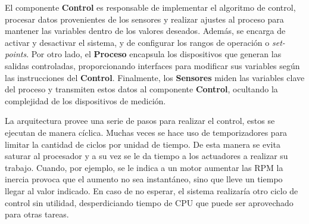 \begin{figure}[h!]
\end{figure}

El componente \textbf{Control} es responsable de implementar el algoritmo de control, procesar datos provenientes de los sensores y realizar ajustes al proceso para mantener las variables dentro de los valores deseados. Además, se encarga de activar y desactivar el sistema, y de configurar los rangos de operación o \textit{set-points}. Por otro lado, el \textbf{Proceso} encapsula los dispositivos que generan las salidas controladas, proporcionando interfaces para modificar sus variables según las instrucciones del \textbf{Control}. Finalmente, los \textbf{Sensores} miden las variables clave del proceso y transmiten estos datos al componente \textbf{Control}, ocultando la complejidad de los dispositivos de medición.

La arquitectura provee una serie de pasos para realizar el control, estos se ejecutan de manera cíclica. Muchas veces se hace uso de temporizadores para limitar la cantidad de ciclos por unidad de tiempo. De esta manera se evita saturar al procesador y a su vez se le da tiempo a los actuadores a realizar su trabajo. Cuando, por ejemplo, se le indica a un motor aumentar las \gls{RPM} la inercia provoca que el aumento no sea instantáneo, sino que lleve un tiempo llegar al valor indicado. En caso de no esperar, el sistema realizaría otro ciclo de control sin utilidad, desperdiciando tiempo de \gls{CPU} que puede ser aprovechado para otras tareas.

